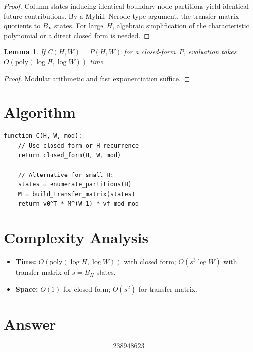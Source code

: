 \documentclass[11pt]{article}
\newtheorem{lemma}[theorem]{Lemma}
\begin{document}
\begin{proof}
Column states inducing identical boundary-node partitions yield identical future contributions. By a Myhill--Nerode-type argument, the transfer matrix quotients to $B_H$ states. For large~$H$, algebraic simplification of the characteristic polynomial or a direct closed form is needed.
\end{proof}

\begin{lemma}
If $C(H,W) = P(H,W)$ for a closed-form~$P$, evaluation takes $O(\mathrm{poly}(\log H, \log W))$ time.
\end{lemma}

\begin{proof}
Modular arithmetic and fast exponentiation suffice.
\end{proof}

\section{Algorithm}

\begin{verbatim}
function C(H, W, mod):
    // Use closed-form or H-recurrence
    return closed_form(H, W, mod)

    // Alternative for small H:
    states = enumerate_partitions(H)
    M = build_transfer_matrix(states)
    return v0^T * M^(W-1) * vf mod mod
\end{verbatim}

\section{Complexity Analysis}

\begin{itemize}
    \item \textbf{Time:} $O(\mathrm{poly}(\log H, \log W))$ with closed form; $O(s^3 \log W)$ with transfer matrix of $s = B_H$ states.
    \item \textbf{Space:} $O(1)$ for closed form; $O(s^2)$ for transfer matrix.
\end{itemize}

\section{Answer}

\[
\boxed{238948623}
\]
\end{document}
